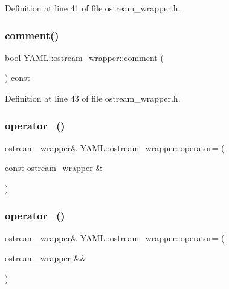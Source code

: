 Definition at line 41 of file ostream\+\_\+wrapper.\+h.

\mbox{\label{class_y_a_m_l_1_1ostream__wrapper_a4bd22f207c3be8398867ca190bf2bcb3}} 
\subsubsection{\texorpdfstring{comment()}{comment()}}
{\footnotesize\ttfamily bool Y\+A\+M\+L\+::ostream\+\_\+wrapper\+::comment (\begin{DoxyParamCaption}{ }\end{DoxyParamCaption}) const\hspace{0.3cm}{\ttfamily [inline]}}



Definition at line 43 of file ostream\+\_\+wrapper.\+h.

\mbox{\label{class_y_a_m_l_1_1ostream__wrapper_affb4d100939be0c8e2e883c680d45382}} 
\subsubsection{\texorpdfstring{operator=()}{operator=()}\hspace{0.1cm}{\footnotesize\ttfamily [1/2]}}
{\footnotesize\ttfamily \mbox{\hyperlink{class_y_a_m_l_1_1ostream__wrapper}{ostream\+\_\+wrapper}}\& Y\+A\+M\+L\+::ostream\+\_\+wrapper\+::operator= (\begin{DoxyParamCaption}\item[{const \mbox{\hyperlink{class_y_a_m_l_1_1ostream__wrapper}{ostream\+\_\+wrapper}} \&}]{ }\end{DoxyParamCaption})\hspace{0.3cm}{\ttfamily [delete]}}

\mbox{\label{class_y_a_m_l_1_1ostream__wrapper_a085cfa4a7970136b8f1d11913964bf18}} 
\subsubsection{\texorpdfstring{operator=()}{operator=()}\hspace{0.1cm}{\footnotesize\ttfamily [2/2]}}
{\footnotesize\ttfamily \mbox{\hyperlink{class_y_a_m_l_1_1ostream__wrapper}{ostream\+\_\+wrapper}}\& Y\+A\+M\+L\+::ostream\+\_\+wrapper\+::operator= (\begin{DoxyParamCaption}\item[{\mbox{\hyperlink{class_y_a_m_l_1_1ostream__wrapper}{ostream\+\_\+wrapper}} \&\&}]{ }\end{DoxyParamCaption})\hspace{0.3cm}{\ttfamily [delete]}}


